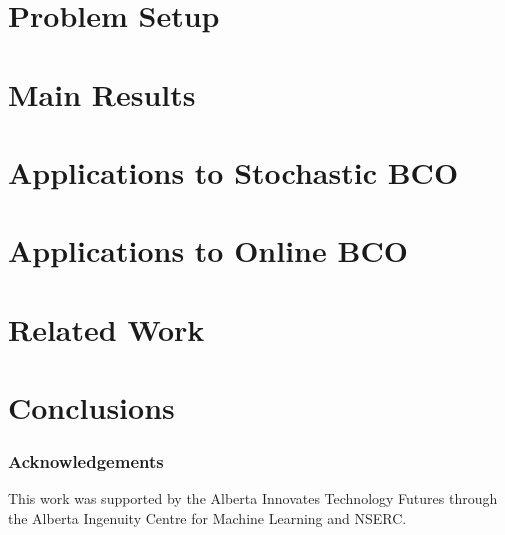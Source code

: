 \documentclass[twoside]{article}
\begin{document}
\section{Problem Setup}
\label{sec:problem}


\section{Main Results}
\label{sec:results}


\section{Applications to Stochastic BCO}
\label{sec:sbco}


\section{Applications to Online BCO}
\label{sec:obco}


\section{Related Work}
\label{sec:related}


%

\section{Conclusions}
\label{sec:conc}


\subsubsection*{Acknowledgements}
This work was supported by the Alberta Innovates Technology Futures through the Alberta Ingenuity Centre for Machine Learning and NSERC.

\clearpage\newpage





\clearpage\newpage
\onecolumn
\appendix

\end{document}
